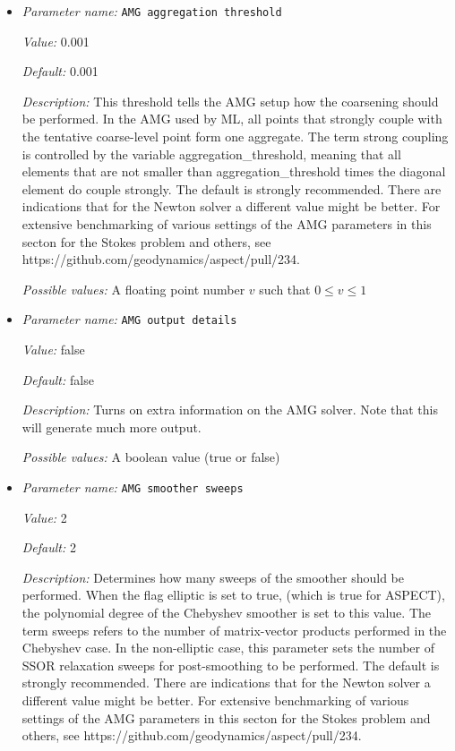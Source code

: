\begin{itemize}
\item {\it Parameter name:} {\tt AMG aggregation threshold}
\label{parameters:Solver parameters/AMG parameters/AMG aggregation threshold}


{\it Value:} 0.001


{\it Default:} 0.001


{\it Description:} This threshold tells the AMG setup how the coarsening should be performed. In the AMG used by ML, all points that strongly couple with the tentative coarse-level point form one aggregate. The term strong coupling is controlled by the variable aggregation\_threshold, meaning that all elements that are not smaller than aggregation\_threshold times the diagonal element do couple strongly. The default is strongly recommended. There are indications that for the Newton solver a different value might be better. For extensive benchmarking of various settings of the AMG parameters in this secton for the Stokes problem and others, see https://github.com/geodynamics/aspect/pull/234.


{\it Possible values:} A floating point number $v$ such that $0 \leq v \leq 1$
\item {\it Parameter name:} {\tt AMG output details}
\label{parameters:Solver parameters/AMG parameters/AMG output details}


{\it Value:} false


{\it Default:} false


{\it Description:} Turns on extra information on the AMG solver. Note that this will generate much more output.


{\it Possible values:} A boolean value (true or false)
\item {\it Parameter name:} {\tt AMG smoother sweeps}
\label{parameters:Solver parameters/AMG parameters/AMG smoother sweeps}


{\it Value:} 2


{\it Default:} 2


{\it Description:} Determines how many sweeps of the smoother should be performed. When the flag elliptic is set to true, (which is true for ASPECT), the polynomial degree of the Chebyshev smoother is set to this value. The term sweeps refers to the number of matrix-vector products performed in the Chebyshev case. In the non-elliptic case, this parameter sets the number of SSOR relaxation sweeps for post-smoothing to be performed. The default is strongly recommended. There are indications that for the Newton solver a different value might be better. For extensive benchmarking of various settings of the AMG parameters in this secton for the Stokes problem and others, see https://github.com/geodynamics/aspect/pull/234.



\end{itemize}
